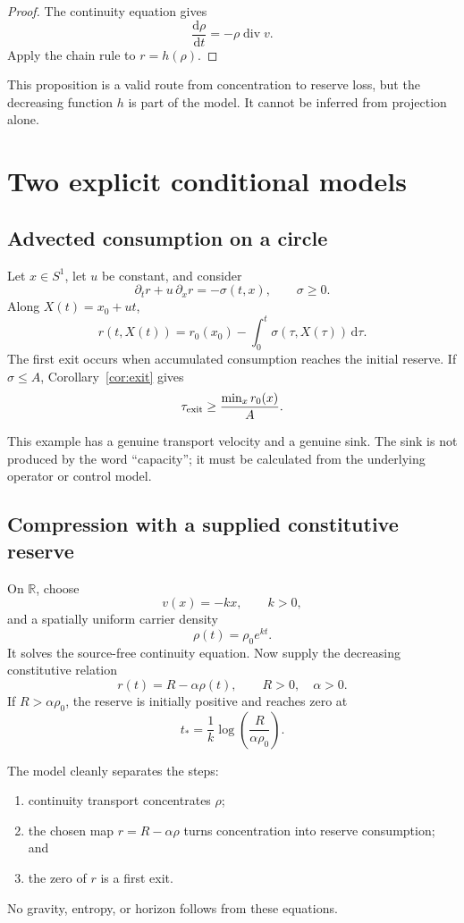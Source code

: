 \documentclass[11pt]{article}
\theoremstyle{definition}
\theoremstyle{remark}
\newcommand{\dd}{\mathrm d}
\newcommand{\Div}{\operatorname{div}}
\begin{document}
\begin{proof}
The continuity equation gives
\[
 \frac{\dd\rho}{\dd t}=-\rho\Div v.
\]
Apply the chain rule to \(r=h(\rho)\).
\end{proof}

This proposition is a valid route from concentration to reserve loss, but
the decreasing function \(h\) is part of the model.  It cannot be inferred
from projection alone.

\section{Two explicit conditional models}
\label{sec:models}

\subsection{Advected consumption on a circle}

Let \(x\in S^1\), let \(u\) be constant, and consider
\[
 \partial_t r+u\,\partial_xr=-\sigma(t,x),
\qquad
 \sigma\ge0.
\]
Along \(X(t)=x_0+ut\),
\[
 r(t,X(t))
=
r_0(x_0)-\int_0^t\sigma(\tau,X(\tau))\,\dd\tau.
\]
The first exit occurs when accumulated consumption reaches the initial
reserve.  If \(\sigma\le A\), Corollary~\ref{cor:exit} gives
\[
 \tau_{\rm exit}\ge\frac{\min_x r_0(x)}{A}.
\]

This example has a genuine transport velocity and a genuine sink.  The
sink is not produced by the word ``capacity''; it must be calculated from
the underlying operator or control model.

\subsection{Compression with a supplied constitutive reserve}

On \(\mathbb R\), choose
\[
 v(x)=-kx,
\qquad
 k>0,
\]
and a spatially uniform carrier density
\[
 \rho(t)=\rho_0e^{kt}.
\]
It solves the source-free continuity equation.  Now supply the decreasing
constitutive relation
\[
 r(t)=R-\alpha\rho(t),
\qquad
 R>0,\quad\alpha>0.
\]
If \(R>\alpha\rho_0\), the reserve is initially positive and reaches zero
at
\[
 t_*=\frac1k\log\left(\frac{R}{\alpha\rho_0}\right).
\]

The model cleanly separates the steps:
\begin{enumerate}[leftmargin=2em]
\item continuity transport concentrates \(\rho\);
\item the chosen map \(r=R-\alpha\rho\) turns concentration into reserve
      consumption; and
\item the zero of \(r\) is a first exit.
\end{enumerate}
No gravity, entropy, or horizon follows from these equations.
\end{document}
